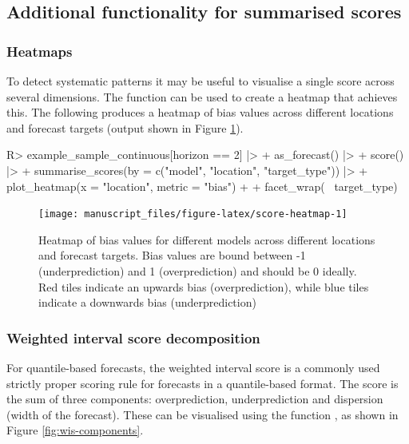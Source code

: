\documentclass[
]{jss}
\begin{document}
\subsection{Additional functionality for summarised
scores}\label{additional-functionality-for-summarised-scores}

\subsubsection{Heatmaps}\label{heatmaps}

To detect systematic patterns it may be useful to visualise a single
score across several dimensions. The function  can
be used to create a heatmap that achieves this. The following produces a
heatmap of bias values across different locations and forecast targets
(output shown in Figure \ref{fig:score-heatmap}).

\begin{CodeChunk}
\begin{CodeInput}
R> example_sample_continuous[horizon == 2] |>
+   as_forecast() |>
+   score() |>
+   summarise_scores(by = c("model", "location", "target_type")) |>
+   plot_heatmap(x = "location", metric = "bias") + 
+     facet_wrap(~ target_type) 
\end{CodeInput}
\begin{figure}[!h]

{\centering \texttt{[image: manuscript\_files/figure-latex/score-heatmap-1]} 

}

\caption[Heatmap of bias values for different models across different locations and forecast targets]{Heatmap of bias values for different models across different locations and forecast targets. Bias values are bound between -1 (underprediction) and 1 (overprediction) and should be 0 ideally. Red tiles indicate an upwards bias (overprediction), while blue tiles indicate a downwards bias (underprediction)}\label{fig:score-heatmap}
\end{figure}
\end{CodeChunk}

\subsubsection{Weighted interval score
decomposition}\label{weighted-interval-score-decomposition}

For quantile-based forecasts, the weighted interval score
\citep[WIS, ][see Section \ref{sec:wis} in the Appendix]{bracherEvaluatingEpidemicForecasts2021}
is a commonly used strictly proper scoring rule for forecasts in a
quantile-based format. The score is the sum of three components:
overprediction, underprediction and dispersion (width of the forecast).
These can be visualised using the function , as shown
in Figure \ref{fig:wis-components}.
\end{document}
